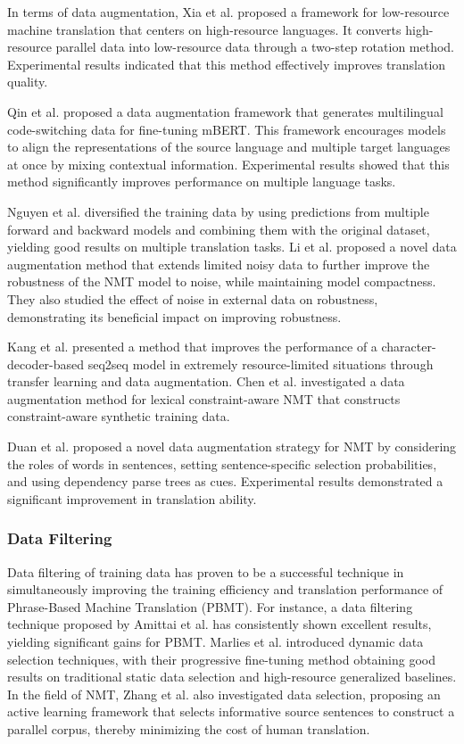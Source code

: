 \documentclass[acmsmall]{acmart}
\begin{document}
In terms of data augmentation, Xia et al. \cite{n4-one1} proposed a framework for low-resource machine translation that centers on high-resource languages. It converts high-resource parallel data into low-resource data through a two-step rotation method. Experimental results indicated that this method effectively improves translation quality. 

Qin et al. \cite{n4-four4} proposed a data augmentation framework that generates multilingual code-switching data for fine-tuning mBERT. This framework encourages models to align the representations of the source language and multiple target languages at once by mixing contextual information. Experimental results showed that this method significantly improves performance on multiple language tasks.

Nguyen et al. \cite{n4-seven7} diversified the training data by using predictions from multiple forward and backward models and combining them with the original dataset, yielding good results on multiple translation tasks. Li et al. \cite{n4-eight8} proposed a novel data augmentation method that extends limited noisy data to further improve the robustness of the NMT model to noise, while maintaining model compactness. They also studied the effect of noise in external data on robustness, demonstrating its beneficial impact on improving robustness.

Kang et al. \cite{n4-nine9} presented a method that improves the performance of a character-decoder-based seq2seq model in extremely resource-limited situations through transfer learning and data augmentation. Chen et al. \cite{n4-ten10} investigated a data augmentation method for lexical constraint-aware NMT that constructs constraint-aware synthetic training data.

Duan et al. \cite{n4-eleven11} proposed a novel data augmentation strategy for NMT by considering the roles of words in sentences, setting sentence-specific selection probabilities, and using dependency parse trees as cues. Experimental results demonstrated a significant improvement in translation ability.

\subsubsection{Data Filtering}

Data filtering of training data has proven to be a successful technique in simultaneously improving the training efficiency and translation performance of Phrase-Based Machine Translation (PBMT). For instance, a data filtering technique proposed by Amittai et al. \cite{n4-6} has consistently shown excellent results, yielding significant gains for PBMT. Marlies et al. \cite{n4-7} introduced dynamic data selection techniques, with their progressive fine-tuning method obtaining good results on traditional static data selection and high-resource generalized baselines. In the field of NMT, Zhang et al. \cite{n4-8} also investigated data selection, proposing an active learning framework that selects informative source sentences to construct a parallel corpus, thereby minimizing the cost of human translation. 
\end{document}
